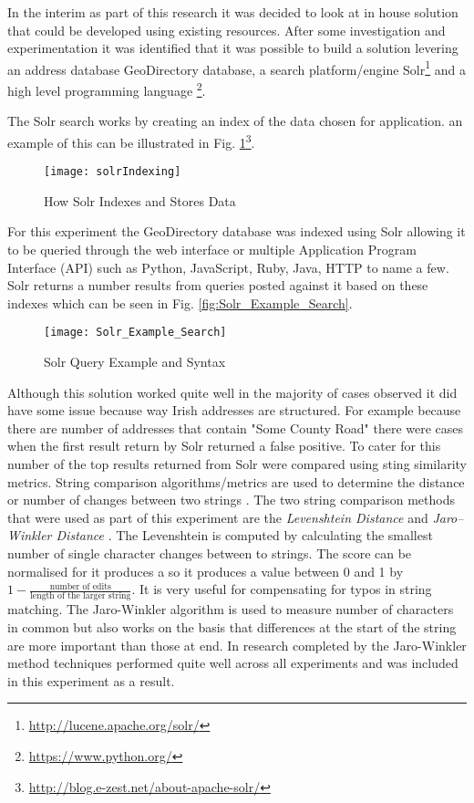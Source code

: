 In the interim as part of this research it was decided to look at in house solution that could be developed using existing resources. After some investigation and experimentation it was identified that it was possible to build a solution levering an address database GeoDirectory database, a search platform/engine Solr\footnote{\url{http://lucene.apache.org/solr/}} and a high level programming language \footnote{\url{https://www.python.org/}}.


The Solr search works by creating an index of the data chosen for application. an example of this can be illustrated in Fig. \ref{fig:solrIndexing}\footnote{\url{http://blog.e-zest.net/about-apache-solr/}}. 

\begin{figure}[H]
	\texttt{[image: solrIndexing]}
	\caption[Illustration of Inverted Indexing]
	{How Solr Indexes and Stores Data}
	\label{fig:solrIndexing}
\end{figure}

For this experiment the GeoDirectory database was indexed using Solr allowing it to be queried through the web interface or multiple Application Program Interface (API) such as Python, JavaScript, Ruby, Java, HTTP to name a few. Solr returns a number results from queries posted against it based on these indexes which can be seen in Fig. \ref{fig:Solr_Example_Search}.

\begin{figure}[H]
	\texttt{[image: Solr\_Example\_Search]}
	\caption{Solr Query Example and Syntax}
	\label{fig:Solr_Example_Search from Web Interface}
\end{figure}

Although this solution worked quite well in the majority of cases observed it did have some issue because way Irish addresses are structured. For example because there are number of addresses that contain "Some County Road" there were cases when the first result return by Solr returned a false positive. To cater for this number of the top results returned from Solr were compared using sting similarity metrics. String comparison algorithms/metrics are used to determine the distance or number of changes between two strings \citep{wagner_string--string_1974}. The two string comparison methods that were used as part of this experiment are the \textit{Levenshtein Distance} \citep{levenshtein_binary_1966} and \textit{Jaro–Winkler Distance} \citep{winkler_string_1990}. The Levenshtein is computed by calculating the smallest number of single character changes between to strings. The score can be normalised for it produces a so it produces a value between 0 and 1 by $1 -\frac{\text{number of edits}}{\text{length of the larger string}}$. It is very useful for compensating for typos in string matching. The Jaro-Winkler algorithm is used to measure number of characters in common but also works on the basis that differences at the start of the string are more important than those at end. In research completed by \cite{christen_comparison_2006} the Jaro-Winkler method techniques performed quite well across all experiments and was included in this experiment as a result. 

